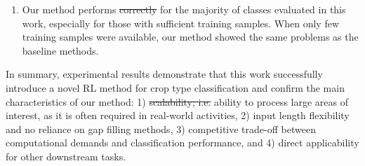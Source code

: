 \documentclass[journal,article,submit,pdftex,moreauthors]{Definitions/mdpi}
\providecommand{\DIFadd}[1]{{\protect\color{blue}\uwave{#1}}} %
\providecommand{\DIFdel}[1]{{\protect\color{red}\sout{#1}}}                      %
\providecommand{\DIFaddbegin}{} %
\providecommand{\DIFaddend}{} %
\providecommand{\DIFdelbegin}{} %
\providecommand{\DIFdelend}{} %
\begin{document}
\begin{enumerate}
    \item Our method performs \DIFdelbegin \DIFdel{correctly }\DIFdelend \DIFaddbegin \DIFadd{well }\DIFaddend for the majority of classes evaluated in this work, especially for those with sufficient training samples. When only few training samples were available, our method showed the same problems as the baseline methods.
\end{enumerate}

In summary, experimental results demonstrate that this work successfully introduce a novel \ac{RL} method for crop type classification and confirm the main characteristics of our method: 1) \DIFdelbegin \DIFdel{scalability; i.e. }\DIFdelend ability to process large areas of interest, as it is often required in real-world activities, 2) input length flexibility and no reliance on gap filling methods, 3) competitive trade-off between computational demands and classification performance, and 4) direct applicability for other downstream tasks.\\

\end{document}
